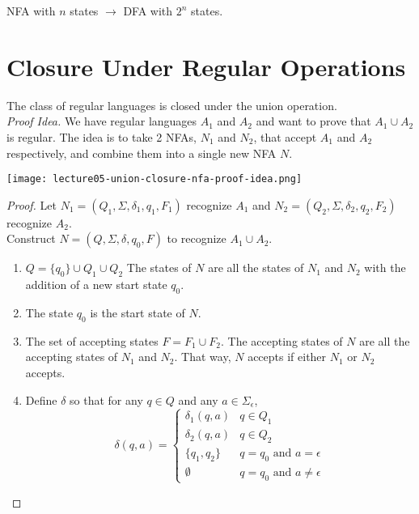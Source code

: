\documentclass[11pt,a4paper]{article}
\begin{document}
\begin{example}
    NFA with $n$ states $\rightarrow$ DFA with $2^n$ states.
\end{example}

\section{Closure Under Regular Operations}
\begin{theorem}
    The class of regular languages is closed under the union operation. \\

    \textit{Proof Idea.} We have regular languages $A_1$ and $A_2$ and want to prove that $A_1\cup A_2$ is regular.
    The idea is to take 2 NFAs, $N_1$ and $N_2$, that accept $A_1$ and $A_2$ respectively, and combine them into a single new NFA $N$.

    \texttt{[image: lecture05-union-closure-nfa-proof-idea.png]}
    \begin{proof}
        Let $N_1=(Q_1,\Sigma,\delta_1,q_1,F_1)$ recognize $A_1$ and $N_2=(Q_2,\Sigma,\delta_2,q_2,F_2)$ recognize $A_2$. \\

        Construct $N=(Q,\Sigma,\delta,q_0,F)$ to recognize $A_1\cup A_2$.

        \begin{enumerate}
            \item $Q=\{q_0\}\cup Q_1\cup Q_2$
            \subitem The states of $N$ are all the states of $N_1$ and $N_2$ with the addition of a new start state $q_0$.
            \item The state $q_0$ is the start state of $N$.
            \item The set of accepting states $F=F_1\cup F_2$.
            \subitem The accepting states of $N$ are all the accepting states of $N_1$ and $N_2$. That way, $N$ accepts if either $N_1$ or $N_2$ accepts.
            \item Define $\delta$ so that for any $q\in Q$ and any $a\in\Sigma_{\epsilon}$,
            $$\delta(q,a)=\begin{cases}
                \delta_1(q,a) & q\in Q_1 \\
                \delta_2(q,a) & q\in Q_2 \\
                \{q_1,q_2\} & q=q_0\text{ and }a=\epsilon \\
                \emptyset & q=q_0\text{ and }a\neq\epsilon
            \end{cases}$$
        \end{enumerate}
    \end{proof}
\end{theorem}
\end{document}
